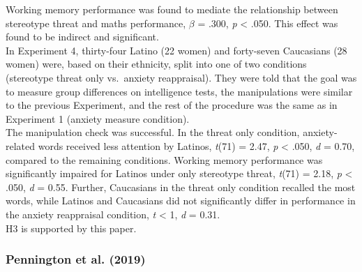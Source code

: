 \documentclass[
  stu,floatsintext]{apa7}
\begin{document}
Working memory performance was found to mediate the relationship between stereotype threat and maths performance, \(\beta\) = .300, \emph{p} \textless{} .050.
This effect was found to be indirect and significant.\\
In Experiment 4, thirty-four Latino (22 women) and forty-seven Caucasians (28 women) were, based on their ethnicity, split into one of two conditions (stereotype threat only vs.~anxiety reappraisal).
They were told that the goal was to measure group differences on intelligence tests, the manipulations were similar to the previous Experiment, and the rest of the procedure was the same as in Experiment 1 (anxiety measure condition).\\
The manipulation check was successful.
In the threat only condition, anxiety-related words received less attention by Latinos, \emph{t}(71) = 2.47, \emph{p} \textless{} .050, \emph{d} = 0.70, compared to the remaining conditions.
Working memory performance was significantly impaired for Latinos under only stereotype threat, \emph{t}(71) = 2.18, \emph{p} \textless{} .050, \emph{d} = 0.55.
Further, Caucasians in the threat only condition recalled the most words, while Latinos and Caucasians did not significantly differ in performance in the anxiety reappraisal condition, \emph{t} \textless{} 1, \emph{d} = 0.31.\\
H3 is supported by this paper.

\subsubsection{Pennington et al. (2019)}\label{penningtonstereotypethreatmay2019}
\end{document}
